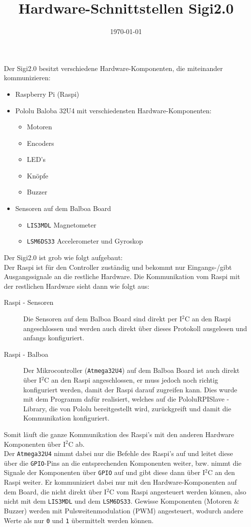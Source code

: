 \documentclass[a4paper]{article}
\title{Hardware-Schnittstellen Sigi2.0}
\date{\today}
\begin{document}
\maketitle
Der Sigi2.0 besitzt verschiedene Hardware-Komponenten, die miteinander kommunizieren:
\begin{itemize}
	\item Raspberry Pi (Raspi)
	\item Pololu Baloba 32U4 mit verschiedensten Hardware-Komponenten:
	\begin{itemize}
		\item Motoren
		\item Encoders
		\item LED's
		\item Knöpfe
		\item Buzzer
	\end{itemize}
	\item Sensoren auf dem Balboa Board
	\begin{itemize}
		\item \verb|LIS3MDL| Magnetometer
		\item \verb|LSM6DS33| Accelerometer und Gyroskop
	\end{itemize}
\end{itemize}
Der Sigi2.0 ist grob wie folgt aufgebaut:\\
Der Raspi ist für den Controller zuständig und bekommt nur Eingangs-/gibt Ausgangssignale an die restliche Hardware. Die Kommunikation vom Raspi mit der restlichen Hardware sieht dann wie folgt aus:
\begin{description}
	\item[Raspi - Sensoren] Die Sensoren auf dem Balboa Board sind direkt per I$^2$C an den Raspi angeschlossen und werden auch direkt über dieses Protokoll ausgelesen und anfangs konfiguriert.
	\item[Raspi - Balboa] Der Mikrocontroller (\verb|Atmega32U4|) auf dem Balboa Board ist auch direkt über I$^2$C an den Raspi angeschlossen, er muss jedoch noch richtig konfiguriert werden, damit der Raspi darauf zugreifen kann. Dies wurde mit dem Programm dafür realisiert, welches auf die PololuRPISlave - Library, die von Pololu bereitgestellt wird, zurückgreift und damit die Kommunikation konfiguriert.
\end{description}
Somit läuft die ganze Kommunikation des Raspi's mit den anderen Hardware Komponenten über I$^2$C ab.\\

Der \verb|Atmega32U4| nimmt dabei nur die Befehle des Raspi's auf und leitet diese über die \verb|GPIO|-Pins an die entsprechenden Komponenten weiter, bzw. nimmt die Signale der Komponenten über \verb|GPIO| auf und gibt diese dann über I$^2$C an den Raspi weiter. Er kommuniziert dabei nur mit den Hardware-Komponenten auf dem Board, die nicht direkt über I$^2$C vom Raspi angesteuert werden können, also nicht mit dem \verb|LIS3MDL| und dem \verb|LSM6DS33|. Gewisse Komponenten (Motoren \& Buzzer) werden mit Pulsweitenmodulation (PWM) angesteuert, wodurch andere Werte als nur \verb|0| und \verb|1| übermittelt werden können.
	
\end{document}
